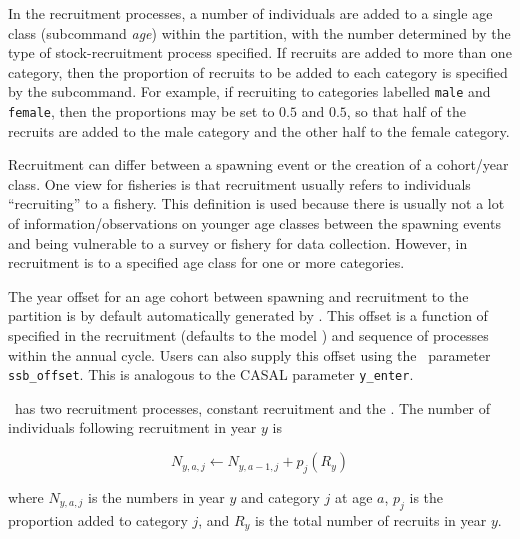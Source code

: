 In the recruitment processes, a number of individuals are added to a single age class (subcommand \textit{age}) within the partition, with the number determined by the type of stock-recruitment process specified. If recruits are added to more than one category, then the proportion of recruits to be added to each category is specified by the  subcommand. For example, if recruiting to categories labelled \texttt{male} and \texttt{female}, then the proportions may be set to $0.5$ and $0.5$, so that half of the recruits are added to the male category and the other half to the female category.

Recruitment can differ between a spawning event or the creation of a cohort/year class. One view for fisheries is that recruitment usually refers to individuals \enquote{recruiting} to a fishery. This definition is used because there is usually not a lot of information/observations on younger age classes between the spawning events and being vulnerable to a survey or fishery for data collection. However, in \CNAME\, recruitment is to a specified age class for one or more categories.

The year offset for an age cohort between spawning and recruitment to the partition is by default automatically generated by \CNAME. This offset is a function of  specified in the recruitment  (defaults to the model ) and sequence of processes within the annual cycle. Users can also supply this offset using the \CNAME\ parameter \texttt{ssb\_offset}. This is analogous to the CASAL parameter \texttt{y\_enter}.

\CNAME\ has two recruitment processes, constant recruitment and the  \citep{1203}. The  number of individuals following recruitment in year $y$ is

\begin{equation}
N_{y,a,j} \leftarrow N_{y,a - 1,j} + p_j(R_y)
\end{equation}

where $N_{y,a,j}$ is the numbers in year $y$ and category $j$ at age $a$, $p_j$ is the proportion added to category $j$, and $R_y$ is the total number of recruits in year $y$.

\paragraph{}\label{sec:Process-RecruitmentConstant}


